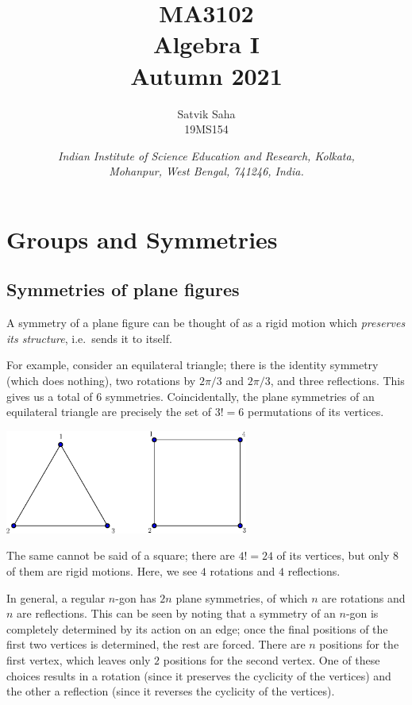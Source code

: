 \documentclass[11pt]{article}
\title{
    \Large\textsc{MA3102} \\
    \Huge \textbf{Algebra I} \\
    \vspace{5pt}
    \Large{Autumn 2021}
}
\author{
    \large Satvik Saha
    \\\textsc{\small 19MS154}
}
\date{\normalsize
    \textit{Indian Institute of Science Education and Research, Kolkata, \\
    Mohanpur, West Bengal, 741246, India.} \\
}
\theoremstyle{definition}
\theoremstyle{remark}
\numberwithin{equation}{section}
\begin{document}
    \maketitle

    \tableofcontents

    \section{Groups and Symmetries}
    \subsection{Symmetries of plane figures}
    A symmetry of a plane figure can be thought of as a rigid motion which
    \emph{preserves its structure}, i.e.\ sends it to itself.

    For example, consider an equilateral triangle; there is the identity symmetry
    (which does nothing), two rotations by $2\pi / 3$ and $2\pi / 3$, and three
    reflections. This gives us a total of $6$ symmetries. Coincidentally, the plane
    symmetries of an equilateral triangle are precisely the set of $3! = 6$
    permutations of its vertices.

    \begin{center}
        \includegraphics[width=0.6\textwidth]{./triangle_square.eps}
    \end{center}

    The same cannot be said of a square; there are $4! = 24$ of its vertices, but
    only $8$ of them are rigid motions. Here, we see $4$ rotations and $4$
    reflections.

    In general, a regular $n$-gon has $2n$ plane symmetries, of which $n$ are
    rotations and $n$ are reflections. This can be seen by noting that a symmetry of
    an $n$-gon is completely determined by its action on an edge; once the final
    positions of the first two vertices is determined, the rest are forced. There are
    $n$ positions for the first vertex, which leaves only $2$ positions for the
    second vertex. One of these choices results in a rotation (since it preserves the
    cyclicity of the vertices) and the other a reflection (since it reverses the
    cyclicity of the vertices).
\end{document}
